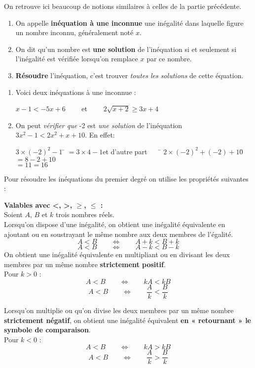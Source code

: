 \documentclass[a4paper,11pt,cours]{nsi}
\begin{document}
On retrouve ici beaucoup de notions similaires à celles de la partie précédente.

\begin{definition}[s]
	\begin{enumerate}[label=\textbullet]
		\item 	On appelle \textbf{inéquation à une inconnue} une inégalité dans laquelle figure un nombre inconnu, généralement noté $x$.
		\item 	On dit qu'un nombre est \textbf{une solution} de l'inéquation si et seulement si l'inégalité est vérifiée lorsqu'on remplace $x$ 
		par ce nombre.
		\item 	\textbf{Résoudre} l'inéquation, c'est trouver \emph{toutes les solutions} de cette équation.
	\end{enumerate}
\end{definition}

\begin{exemple}[s]
	\begin{enumerate}[label=\textbullet]
		\item Voici deux inéquations à une inconnue :
		
		$x-1<-5x+6\qquad$ et $\qquad2\sqrt{x+2}\geqslant 3x+4$
		\item On peut \emph{vérifier que} -2 est \emph{une solution} de l'inéquation $3x^2-1<2x^2+x+10$. En effet:
		\begin{tabbing}
			$3\times (-2)^2-1$	\=	$=3\times 4-1$\qquad et d'autre part$\qquad$\= $ 2\times(-2)^2+(-2)+10$\=$=8-2+10$\\
			\>	$=11$\>\>$=16$
		\end{tabbing}
	\end{enumerate}
\end{exemple}

Pour résoudre les inéquations du premier degré on utilise les propriétés suivantes :

\begin{propriete}[s]\textbf{\boldmath Valables avec <, >, $\geqslant$, $\leqslant$ :}\\[0.5em]
	Soient $A$, $B$ et $k$ trois nombres réels.\\
	Lorsqu'on dispose d'une inégalité, on obtient une inégalité équivalente en ajoutant ou en soustrayant le même nombre aux deux membres de 
	l'égalité.
	$$A<B\qquad \Longleftrightarrow\qquad A+k<B+k$$
	$$A<B\qquad \Longleftrightarrow\qquad A-k<B-k$$
	On obtient une inégalité équivalente en multipliant ou en divisant les deux membres par un  même nombre \textbf{strictement positif}.\\
	Pour $k>0$ :
	$$A<B\qquad \Longleftrightarrow\qquad kA<kB$$
	$$A<B\qquad \Longleftrightarrow\qquad \dfrac{A}{k}<\dfrac{B}{k}$$
	
	Lorsqu'on multiplie ou qu'on divise les deux membres par un  même nombre \textbf{strictement négatif}, on obtient une inégalité équivalent 
	\textbf{en « retournant » le symbole de comparaison}. \\
	Pour $k<0$ :
	$$A<B\qquad \Longleftrightarrow\qquad kA>kB$$
	$$A<B\qquad \Longleftrightarrow\qquad \dfrac{A}{k}>\dfrac{B}{k}$$
\end{propriete}
\end{document}
